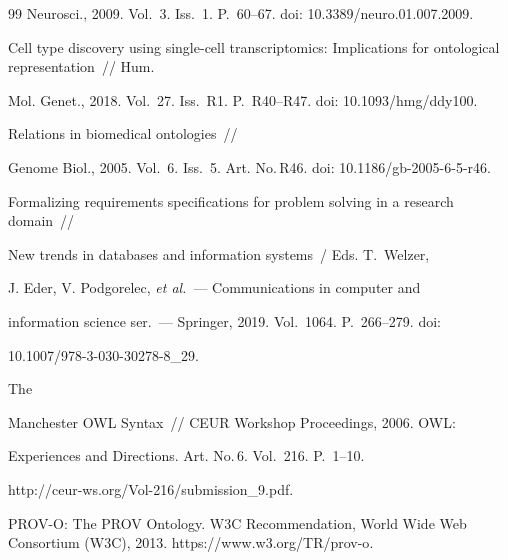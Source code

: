{{\begin{thebibliography}{99}
Neurosci., 2009. Vol.~3. Iss.~1. P.~60--67. doi: 10.3389/neuro.01.007.2009.


 Cell type discovery using single-cell transcriptomics: Implications for ontological representation~/\!\!/ Hum.

 Mol. Genet., 2018. Vol.~27. Iss.~R1. P.~R40--R47. doi: 10.1093/hmg/ddy100.


 Relations in biomedical ontologies~/\!\!/

 Genome Biol., 2005. Vol.~6. Iss.~5. Art. No.\,R46. doi: 10.1186/gb-2005-6-5-r46.


 Formalizing requirements specifications for problem solving in a research domain~/\!\!/ 

New trends in databases and information systems~/ Eds. T.~Welzer, 

J. Eder, V. Podgorelec, \textit{et al.}~--- Communications in computer and

 information science ser.~--- Springer, 2019. Vol.~1064. P.~266--279. doi: 

10.1007/978-3-030-30278-8\_29.


 The

 Manchester OWL Syntax~/\!\!/  CEUR Workshop Proceedings, 2006. OWL:

 Experiences and Directions. Art. No.\,6. Vol.~216. P.~1--10.

{\sf http://ceur-ws.org/Vol-216/submission\_9.pdf}.



\mbox{PROV-O}: The PROV Ontology. W3C Recommendation, World Wide Web Consortium (W3C), 2013. {\sf https://www.w3.org/TR/prov-o}.



                   \end{thebibliography}

        } }

        

        

